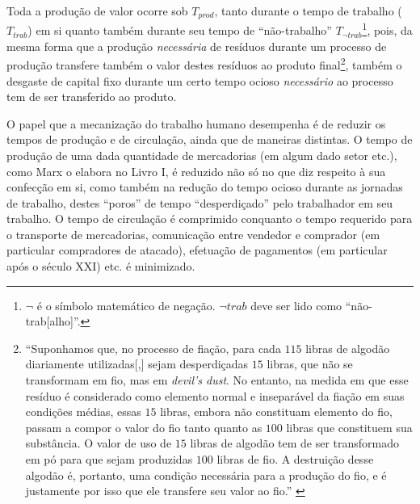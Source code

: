 \documentclass[12pt]{article}
\numberwithin{equation}{section}
\theoremstyle{plain}
\theoremstyle{definition}
\theoremstyle{remark}
\begin{document}
Toda a produção de valor ocorre sob $T_{prod}$, tanto durante o tempo de trabalho ($T_{trab}$) em si quanto também durante seu tempo de ``não-trabalho'' $T_{\lnot trab}$\footnote{$\lnot$ é o símbolo matemático de negação. $\lnot trab$ deve ser lido como ``não-trab[alho]''.}, pois, da mesma forma que a produção \textit{necessária} de resíduos durante um processo de produção transfere também o valor destes resíduos ao produto final\footnote{``Suponhamos que, no processo de fiação, para cada $115$ libras de algodão diariamente utilizadas[,] sejam desperdiçadas $15$ libras, que não se transformam em fio, mas em \textit{devil's dust}. No entanto, na medida em que esse resíduo é considerado como elemento normal e inseparável da fiação em suas condições médias, essas $15$ libras, embora não constituam elemento do fio, passam a compor o valor do fio tanto quanto as $100$ libras que constituem sua substância. O valor de uso de $15$ libras de algodão tem de ser transformado em pó para que sejam produzidas $100$ libras de fio. A destruição desse algodão é, portanto, uma condição necessária para a produção do fio, e é justamente por isso que ele transfere seu valor ao fio.'' \parencite[p. 282]{Marx2017}}, também o desgaste de capital fixo durante um certo tempo ocioso \textit{necessário} ao processo tem de ser transferido ao produto.

O papel que a mecanização do trabalho humano desempenha é de reduzir os tempos de produção e de circulação, ainda que de maneiras distintas. O tempo de produção de uma dada quantidade de mercadorias (em algum dado setor etc.), como Marx o elabora no Livro I, é reduzido não só no que diz respeito à sua confecção em si, como também na redução do tempo ocioso durante as jornadas de trabalho, destes ``poros'' de tempo ``desperdiçado'' pelo trabalhador em seu trabalho. O tempo de circulação é comprimido conquanto o tempo requerido para o transporte de mercadorias, comunicação entre vendedor e comprador (em particular compradores de atacado), efetuação de pagamentos (em particular após o século XXI) etc. é minimizado.

\end{document}

